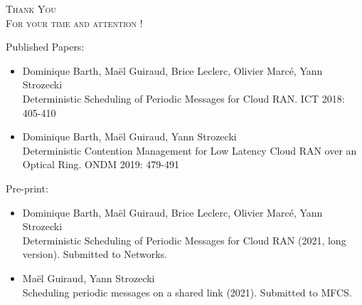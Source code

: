 \documentclass[10 pt]{beamer}
\begin{document}
\begin{frame}
\begin{center}
\huge{\scshape Thank You \\ For your time and attention !}
\end{center}
\vspace{1cm}

 \begin{multicols}{2}
Published Papers:
\begin{itemize}
  \item 
\tiny{Dominique Barth, Maël Guiraud, Brice Leclerc, Olivier Marcé, Yann Strozecki\\
Deterministic Scheduling of Periodic Messages for Cloud RAN. ICT 2018: 405-410}
  \item \tiny{Dominique Barth, Maël Guiraud, Yann Strozecki\\
Deterministic Contention Management for Low Latency Cloud RAN over an Optical Ring. ONDM 2019: 479-491}
\end{itemize}

Pre-print:
\begin{itemize}
  \item \tiny{Dominique Barth, Maël Guiraud, Brice Leclerc, Olivier Marcé, Yann Strozecki\\
Deterministic Scheduling of Periodic Messages for Cloud RAN (2021, long version). Submitted to Networks.}
  \item \tiny{Maël Guiraud, Yann Strozecki\\
Scheduling periodic messages on a shared link (2021). Submitted to MFCS.}
\end{itemize}

\end{multicols}

\end{frame}
\end{document}
